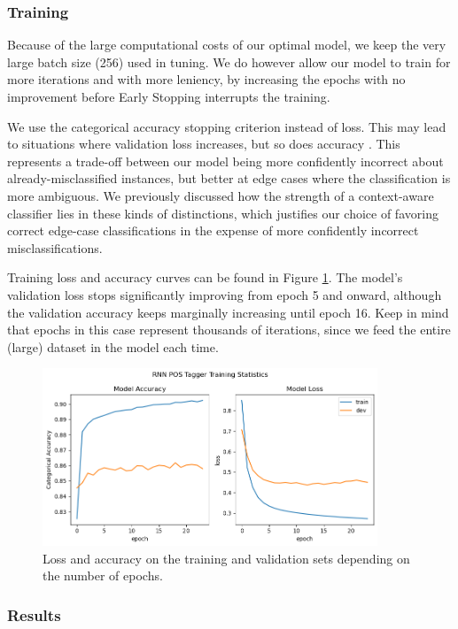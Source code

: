 \documentclass[10pt, a4paper]{article}
\begin{document}
	
	\subsubsection{Training}
	
	Because of the large computational costs of our optimal model, we keep the very large batch size (256) used in tuning. We do however allow our model to train for more iterations and with more leniency, by increasing the epochs with no improvement before Early Stopping interrupts the training.
	
	We use the categorical accuracy stopping criterion instead of loss. This may lead to situations where validation loss increases, but so does accuracy \cite{loss-accuracy}. This represents a trade-off between our model being more confidently incorrect about already-misclassified instances, but better at edge cases where the classification is more ambiguous. We previously discussed how the strength of a context-aware classifier lies in these kinds of distinctions, which justifies our choice of favoring correct edge-case classifications in the expense of more confidently incorrect misclassifications.
	
	Training loss and accuracy curves can be found in Figure \ref{fig::ex_2_fit}. The model's validation loss stops significantly improving from epoch 5 and onward, although the validation accuracy keeps marginally increasing until epoch 16. Keep in mind that epochs in this case represent thousands of iterations, since we feed the entire (large) dataset in the model each time.
	
	\begin{figure}
		\centering
		\includegraphics[width=10cm]{"ex_2_fit.png"}
		\caption{Loss and accuracy on the training and validation sets depending on the number of epochs.}
		\label{fig::ex_2_fit}
	\end{figure}
	
	\subsubsection{Results}
	
\end{document}
